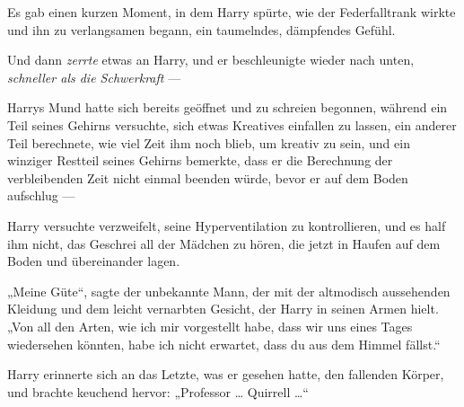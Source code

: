 Es gab einen kurzen Moment, in dem Harry spürte, wie der Federfalltrank wirkte und ihn zu verlangsamen begann, ein taumelndes, dämpfendes Gefühl.

Und dann \emph{zerrte} etwas an Harry, und er beschleunigte wieder nach unten, \emph{schneller als die Schwerkraft} —

Harrys Mund hatte sich bereits geöffnet und zu schreien begonnen, während ein Teil seines Gehirns versuchte, sich etwas Kreatives einfallen zu lassen, ein anderer Teil berechnete, wie viel Zeit ihm noch blieb, um kreativ zu sein, und ein winziger Restteil seines Gehirns bemerkte, dass er die Berechnung der verbleibenden Zeit nicht einmal beenden würde, bevor er auf dem Boden aufschlug —

\later

Harry versuchte verzweifelt, seine Hyperventilation zu kontrollieren, und es half ihm nicht, das Geschrei all der Mädchen zu hören, die jetzt in Haufen auf dem Boden und übereinander lagen.

„Meine Güte“, sagte der unbekannte Mann, der mit der altmodisch aussehenden Kleidung und dem leicht vernarbten Gesicht, der Harry in seinen Armen hielt.
„Von all den Arten, wie ich mir vorgestellt habe, dass wir uns eines Tages wiedersehen könnten, habe ich nicht erwartet, dass du aus dem Himmel fällst.“

Harry erinnerte sich an das Letzte, was er gesehen hatte, den fallenden Körper, und brachte keuchend hervor:
„Professor … Quirrell …“

